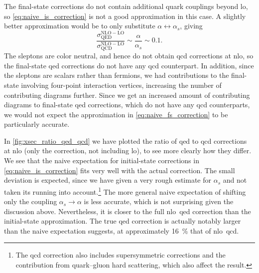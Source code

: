 The final-state corrections do not contain additional quark couplings beyond \gls{lo}, so \cref{eq:naive_is_correction} is not a good approximation in this case.
A slightly better approximation would be to only substitute $\alpha \leftrightarrow \alpha_s$, giving
\begin{equation}\label{eq:naive_fs_correction}
    \frac{\sigma_{\mathrm{QED}}^{\mathrm{NLO}-\mathrm{LO}}}{\sigma_{\mathrm{QCD}}^{\mathrm{NLO}-\mathrm{LO}}} \sim \frac{\alpha}{\alpha_s} \sim 0.1.
\end{equation}
The sleptons are color neutral, and hence do not obtain \gls{qcd} corrections at \gls{nlo}, so the final-state \gls{qed} corrections do not have any \gls{qcd} counterpart.
In addition, since the sleptons are scalars rather than fermions, we had contributions to the final-state involving four-point interaction vertices, increasing the number of contributing diagrams further.
Since we get an increased amount of contributing diagrams to final-state \gls{qed} corrections, which do not have any \gls{qcd} counterparts, we would not expect the approximation in \cref{eq:naive_fs_correction} to be particularly accurate.

In \cref{fig:xsec_ratio_qed_qcd} we have plotted the ratio of \gls{qed} to \gls{qcd} corrections at \gls{nlo} (only the correction, not including \gls{lo}), to see more clearly how they differ.
We see that the naive expectation for initial-state corrections in \cref{eq:naive_is_correction} fits very well with the actual correction.
The small deviation is expected, since we have given a very rough estimate for $\alpha_s$ and not taken its running into account.\footnote{The \gls{qcd} correction also includes supersymmetric corrections and the contribution from quark--gluon hard scattering, which also affect the result.}
The more general naive expectation of shifting only the coupling $\alpha_s\to\alpha$ is less accurate, which is not surprising given the discussion above.
Nevertheless, it is closer to the full \gls{nlo}~\gls{qed} correction than the initial-state approximation.
The true \gls{qed} correction is actually notably larger than the naive expectation suggests, at approximately \qty{16}{\percent} that of \gls{nlo}~\gls{qcd}.